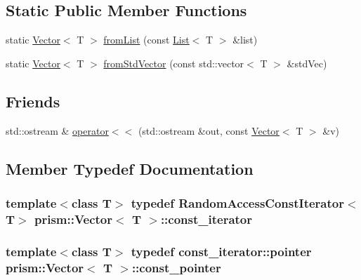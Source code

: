 \subsection*{Static Public Member Functions}
\begin{DoxyCompactItemize}
\item 
static \hyperlink{classprism_1_1_vector}{Vector}$<$ T $>$ \hyperlink{classprism_1_1_vector_a66de66a61b4577aa20f6a6f5e4b8e99d}{from\+List} (const \hyperlink{classprism_1_1_list}{List}$<$ T $>$ \&list)
\item 
static \hyperlink{classprism_1_1_vector}{Vector}$<$ T $>$ \hyperlink{classprism_1_1_vector_ac947685add7d54b025a471b59445fc6a}{from\+Std\+Vector} (const std\+::vector$<$ T $>$ \&std\+Vec)
\end{DoxyCompactItemize}
\subsection*{Friends}
\begin{DoxyCompactItemize}
\item 
std\+::ostream \& \hyperlink{classprism_1_1_vector_adea1a7e2e26629669d11a49d8899a1ec}{operator$<$$<$} (std\+::ostream \&out, const \hyperlink{classprism_1_1_vector}{Vector}$<$ T $>$ \&v)
\end{DoxyCompactItemize}


\subsection{Member Typedef Documentation}
\subsubsection[{\texorpdfstring{const\+\_\+iterator}{const_iterator}}]{\setlength{\rightskip}{0pt plus 5cm}template$<$class T$>$ typedef {\bf Random\+Access\+Const\+Iterator}$<$T$>$ {\bf prism\+::\+Vector}$<$ T $>$\+::{\bf const\+\_\+iterator}}\hypertarget{classprism_1_1_vector_acc6ed07e2d7ed5065feec92a83e46fa4}{}\label{classprism_1_1_vector_acc6ed07e2d7ed5065feec92a83e46fa4}
\subsubsection[{\texorpdfstring{const\+\_\+pointer}{const_pointer}}]{\setlength{\rightskip}{0pt plus 5cm}template$<$class T$>$ typedef {\bf const\+\_\+iterator\+::pointer} {\bf prism\+::\+Vector}$<$ T $>$\+::{\bf const\+\_\+pointer}}\hypertarget{classprism_1_1_vector_a0bf16322f83f0ad9103815a1cac16156}{}\label{classprism_1_1_vector_a0bf16322f83f0ad9103815a1cac16156}
